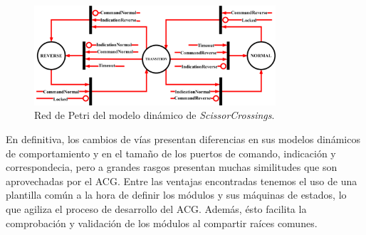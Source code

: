 	\begin{figure}[H]
		\centering
		\includegraphics[width=0.8\textwidth]{Figuras/SSW_Petri}
		\centering\caption{Red de Petri del modelo dinámico de \textit{ScissorCrossings}.}
		\label{fig:SCR_Petri}
	\end{figure}
	
	En definitiva, los cambios de vías presentan diferencias en sus modelos dinámicos de comportamiento y en el tamaño de los puertos de comando, indicación y correspondecia, pero a grandes rasgos presentan muchas similitudes que son aprovechadas por el ACG. Entre las ventajas encontradas tenemos el uso de una plantilla común a la hora de definir los módulos y sus máquinas de estados, lo que agiliza el proceso de desarrollo del ACG. Además, ésto facilita la comprobación y validación de los módulos al compartir raíces comunes.
